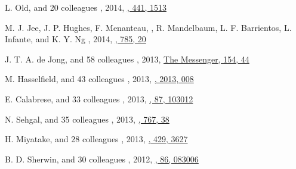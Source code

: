 \begin{etaremune}
\item
L. Old, and 20 colleagues
,
2014, \href{https://ui.adsabs.harvard.edu/abs/2014MNRAS.441.1513O}{\mnras, 441, 1513}

\item
M. J. Jee, J. P. Hughes, F. Menanteau, \myself, R. Mandelbaum, L. F. Barrientos, L. Infante, and K. Y. Ng
,
2014, \href{https://ui.adsabs.harvard.edu/abs/2014ApJ...785...20J}{\apj, 785, 20}

\item
J. T. A. de Jong, and 58 colleagues
,
2013, \href{https://ui.adsabs.harvard.edu/abs/2013Msngr.154...44D}{The Messenger, 154, 44}

\item
M. Hasselfield, and 43 colleagues
,
2013, \href{https://ui.adsabs.harvard.edu/abs/2013JCAP...07..008H}{\jcap, 2013, 008}

\item
E. Calabrese, and 33 colleagues
,
2013, \href{https://ui.adsabs.harvard.edu/abs/2013PhRvD..87j3012C}{\prd, 87, 103012}

\item
N. Sehgal, and 35 colleagues
,
2013, \href{https://ui.adsabs.harvard.edu/abs/2013ApJ...767...38S}{\apj, 767, 38}

\item
H. Miyatake, and 28 colleagues
,
2013, \href{https://ui.adsabs.harvard.edu/abs/2013MNRAS.429.3627M}{\mnras, 429, 3627}

\item
B. D. Sherwin, and 30 colleagues
,
2012, \href{https://ui.adsabs.harvard.edu/abs/2012PhRvD..86h3006S}{\prd, 86, 083006}


\end{etaremune}
